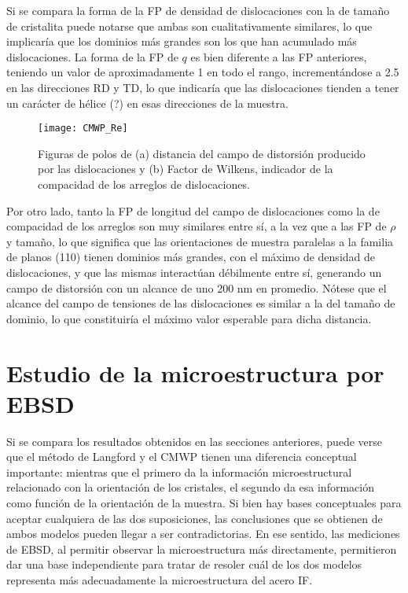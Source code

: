 Si se compara la forma de la FP de densidad de dislocaciones con la de tamaño de cristalita puede notarse que ambas son cualitativamente similares, lo que implicaría que los dominios más grandes son los que han acumulado más dislocaciones.
La forma de la FP de $q$ es bien diferente a las FP anteriores, teniendo un valor de aproximadamente 1 en todo el rango, incrementándose a 2.5 en las direcciones RD y TD, lo que indicaría que las dislocaciones tienden a tener un carácter de hélice (?) en esas direcciones de la muestra.

\begin{figure}[!htb]
  \centering
  \texttt{[image: CMWP\_Re]}
  \caption{Figuras de polos de (a) distancia del campo de distorsión producido por las dislocaciones y (b) Factor de Wilkens, indicador de la compacidad de los arreglos de dislocaciones.}
  \label{fig:IFCMWPRe}
\end{figure}

Por otro lado, tanto la FP de longitud del campo de dislocaciones como la de compacidad de los arreglos son muy similares entre sí, a la vez que a las FP de $\rho$ y tamaño, lo que significa que las orientaciones de muestra paralelas a la familia de planos (110) tienen dominios más grandes, con el máximo de densidad de dislocaciones, y que las mismas interactúan débilmente entre sí, generando un campo de distorsión con un alcance de uno 200 nm en promedio. Nótese que el alcance del campo de tensiones de las dislocaciones es similar a la del tamaño de dominio, lo que constituiría el máximo valor esperable para dicha distancia.

\section{Estudio de la microestructura por EBSD}\label{S:IFEBSD}
Si se compara los resultados obtenidos en las secciones anteriores, puede verse que el método de Langford y el CMWP tienen una diferencia conceptual importante: mientras que el primero da la información microestructural relacionado con la orientación de los cristales, el segundo da esa información como función de la orientación de la muestra.
Si bien hay bases conceptuales para aceptar cualquiera de las dos suposiciones, las conclusiones que se obtienen de ambos modelos pueden llegar a ser contradictorias.
En ese sentido, las mediciones de EBSD, al permitir observar la microestructura más directamente, permitieron dar una base independiente para tratar de resoler cuál de los dos modelos representa más adecuadamente la microestructura del acero IF.

